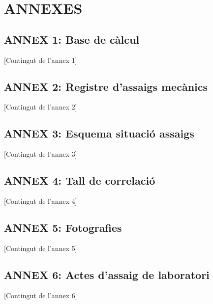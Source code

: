 \documentclass{g3dt-report}
\begin{document}
\appendix

\section*{ANNEXES}

\subsection*{ANNEX 1: Base de càlcul}
[Contingut de l'annex 1]

\subsection*{ANNEX 2: Registre d'assaigs mecànics}
[Contingut de l'annex 2]

\subsection*{ANNEX 3: Esquema situació assaigs}
[Contingut de l'annex 3]

\subsection*{ANNEX 4: Tall de correlació}
[Contingut de l'annex 4]

\subsection*{ANNEX 5: Fotografies}
[Contingut de l'annex 5]

\subsection*{ANNEX 6: Actes d'assaig de laboratori}
[Contingut de l'annex 6]
\end{document}
